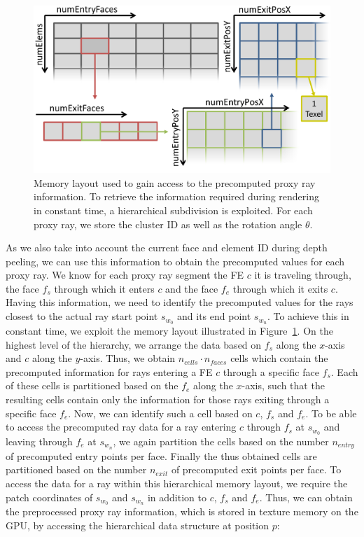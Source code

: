 \documentclass[review,journal]{vgtc}         %
\begin{document}
\begin{figure}[t]
    \centering
    \includegraphics[width=\linewidth]{figures/curvetexmap-memorylayout}
    \caption{Memory layout used to gain access to the precomputed proxy ray information. To retrieve the information required during rendering in constant time, a hierarchical subdivision is exploited. For each proxy ray, we store the cluster ID as well as the rotation angle $\theta$.}
    \label{fig:memorylayout}
\end{figure}
As we also take into account the current face and element ID during depth peeling, we can use this information to obtain the precomputed values for each proxy ray. We know for each proxy ray segment the FE $c$ it is traveling through, the face $f_s$ through which it enters $c$ and the face $f_e$ through which it exits $c$. Having this information, we need to identify the precomputed values for the rays closest to the actual ray start point $s_{w_0}$ and its end point $s_{w_n}$. To achieve this in constant time, we exploit the memory layout illustrated in Figure~\ref{fig:memorylayout}. On the highest level of the hierarchy, we arrange the data based on $f_s$ along the $x$-axis and $c$ along the $y$-axis. Thus, we obtain $n_{cells} \cdot n_{faces}$ cells which contain the precomputed information for rays entering a FE $c$ through a specific face $f_s$. Each of these cells is partitioned based on the $f_e$ along the $x$-axis, such that the resulting cells contain only the information for those rays exiting through a specific face $f_e$. Now, we can identify such a cell based on $c$, $f_s$ and $f_e$. To be able to access the precomputed ray data for a ray entering $c$ through $f_s$ at $s_{w_0}$ and leaving through $f_e$ at $s_{w_n}$, we again partition the cells based on the number $n_{entry}$ of precomputed entry points per face. Finally the thus obtained cells are partitioned based on the number $n_{exit}$ of precomputed exit points per face. To access the data for a ray within this hierarchical memory layout, we require the patch coordinates of $s_{w_0}$ and $s_{w_n}$ in addition to $c$, $f_s$ and $f_e$. Thus, we can obtain the preprocessed proxy ray information, which is stored in texture memory on the GPU, by accessing the hierarchical data structure at position $p$:
\end{document}
